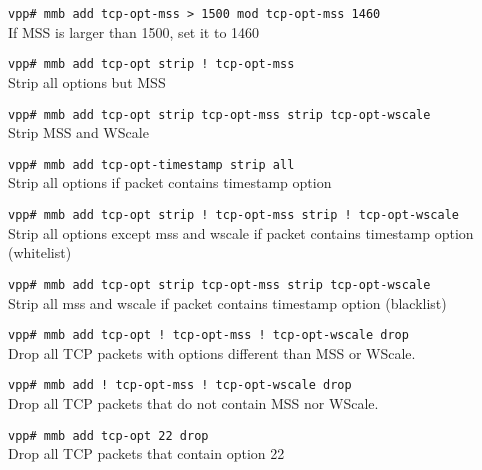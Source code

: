 \documentclass[a4paper,twoside,11pt]{report}
\begin{document}
\texttt{vpp\# mmb add tcp-opt-mss > 1500 mod tcp-opt-mss 1460} \\
   If MSS is larger than 1500, set it to 1460

\texttt{vpp\# mmb add tcp-opt strip !\ tcp-opt-mss} \\
   Strip all options but MSS

\texttt{vpp\# mmb add tcp-opt strip tcp-opt-mss strip tcp-opt-wscale} \\
   Strip MSS and WScale

\texttt{vpp\# mmb add tcp-opt-timestamp strip all} \\
   Strip all options if packet contains timestamp option

\texttt{vpp\# mmb add tcp-opt strip !\ tcp-opt-mss strip !\ tcp-opt-wscale} \\
   Strip all options except mss and wscale if packet contains timestamp option (whitelist)

\texttt{vpp\# mmb add tcp-opt strip tcp-opt-mss strip tcp-opt-wscale} \\
   Strip all mss and wscale if packet contains timestamp option (blacklist)

\texttt{vpp\# mmb add tcp-opt !\ tcp-opt-mss !\ tcp-opt-wscale  drop} \\
   Drop all TCP packets with options different than MSS or WScale.

\texttt{vpp\# mmb add !\ tcp-opt-mss !\ tcp-opt-wscale drop} \\
   Drop all TCP packets that do not contain MSS nor WScale.

\texttt{vpp\# mmb add tcp-opt 22 drop} \\
   Drop all TCP packets that contain option 22




\small

%
\end{document}
